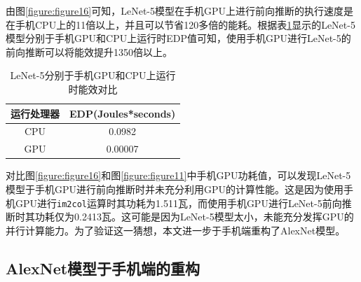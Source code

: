 由图\ref{figure:figure16}可知，LeNet-5模型在手机GPU上进行前向推断的执行速度是在手机CPU上的11倍以上，并且可以节省120多倍的能耗。根据表\ref{table:table6}显示的LeNet-5模型分别于手机GPU和CPU上运行时EDP值可知，使用手机GPU进行LeNet-5的前向推断可以将能效提升1350倍以上。

\begin{table}[htbp]
  \centering
  \caption{LeNet-5分别于手机GPU和CPU上运行时能效对比}
  \label{table:table6}
  \begin{tabular}{cc}
    \toprule
      运行处理器 & EDP(Joules*seconds) \\
    \midrule
      CPU & 0.0982 \\
      GPU & 0.00007 \\
    \bottomrule
  \end{tabular}
\end{table}

对比图\ref{figure:figure16}和图\ref{figure:figure11}中手机GPU功耗值，可以发现LeNet-5模型于手机GPU进行前向推断时并未充分利用GPU的计算性能。这是因为使用手机GPU进行\texttt{im2col}运算时其功耗为1.511瓦，而使用手机GPU进行LeNet-5前向推断时其功耗仅为0.2413瓦。这可能是因为LeNet-5模型太小，未能充分发挥GPU的并行计算能力。为了验证这一猜想，本文进一步于手机端重构了AlexNet模型。

\subsection{AlexNet模型于手机端的重构}

